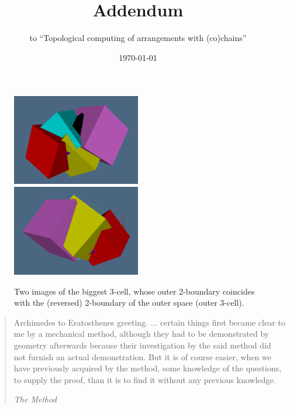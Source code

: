 \documentclass[11pt, oneside]{amsart}   	%
\title[Addendum]{Addendum}
\author{to ``Topological computing of arrangements with (co)chains''}
\date{\today}							%
\begin{document}
\maketitle
\thispagestyle{empty}


\begin{figure}[htbp] %
   \centering
   \includegraphics[width=0.50\textwidth]{img/32.pdf}%
   \includegraphics[width=0.50\textwidth]{img/34.pdf}%
   
   \caption{Two images of the biggest 3-cell, whose outer 2-boundary coincides with the (reversed) 2-boundary of the outer space (outer 3-cell).}
   \label{fig:input}
\end{figure}

\nonstopmode


\begin{quote}
Archimedes to Eratosthenes greeting. ... certain things first became clear to me by a mechanical method, although they had to be demonstrated by geometry afterwards because their investigation by the said method did not furnish an actual demonstration. But it is of course easier, when we have previously acquired by the method, some knowledge of the questions, to supply the proof, than it is to find it without any previous knowledge.

\flushright \emph{The Method}
\end{quote}
\end{document}
